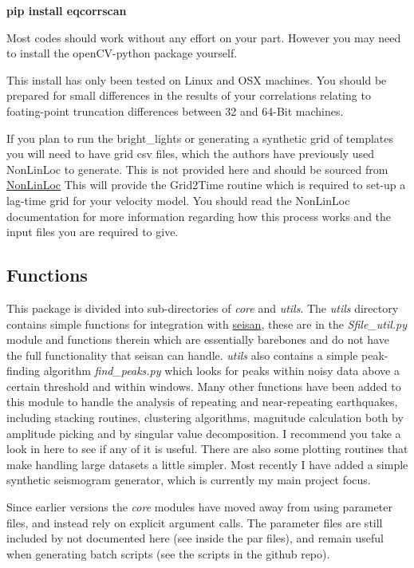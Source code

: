 \documentclass[a4paper,10pt,english]{sphinxmanual}
\begin{document}
\textbf{pip install eqcorrscan}

Most codes should work without any effort on your part.  However you may need to
install the openCV-python package yourself.

This install has only been tested on Linux and OSX machines.  You
should be prepared for small differences in the results of your correlations
relating to foating-point truncation differences between 32 and 64-Bit
machines.

If you plan to run the bright\_lights or generating a synthetic grid of
templates you will need to have grid csv files, which the authors have
previously used NonLinLoc to generate.  This is not provided here and should
be sourced from \href{http://alomax.free.fr/nlloc/}{NonLinLoc} This will provide
the Grid2Time routine which is required to set-up a lag-time grid for your
velocity model.  You should read the NonLinLoc documentation for more
information regarding how this process works and the input files you are
required to give.


\subsection{Functions}
\label{intro:functions}
This package is divided into sub-directories of \emph{core} and \emph{utils}.  The
\emph{utils} directory contains simple functions for integration with
\href{http://seisan.info/}{seisan}, these are in the \emph{Sfile\_util.py}
module and functions therein which are essentially barebones and do not have the
full functionality that seisan can handle.  \emph{utils} also contains a simple
peak-finding algorithm \emph{find\_peaks.py} which looks for peaks within noisy data
above a certain threshold and within windows.  Many other functions have been
added to this module to handle the analysis of repeating and near-repeating
earthquakes, including stacking routines, clustering algorithms, magnitude
calculation both by amplitude picking and by singular value decomposition.  I
recommend you take a look in here to see if any of it is useful.  There are also
some plotting routines that make handling large datasets a little simpler.  Most
recently I have added a simple synthetic seismogram generator, which is currently
my main project focus.

Since earlier versions the \emph{core} modules have moved away from using parameter
files, and instead rely on explicit argument calls.  The parameter files are
still included by not documented here (see inside the par files), and remain
useful when generating batch scripts (see the scripts in the github repo).
\end{document}
